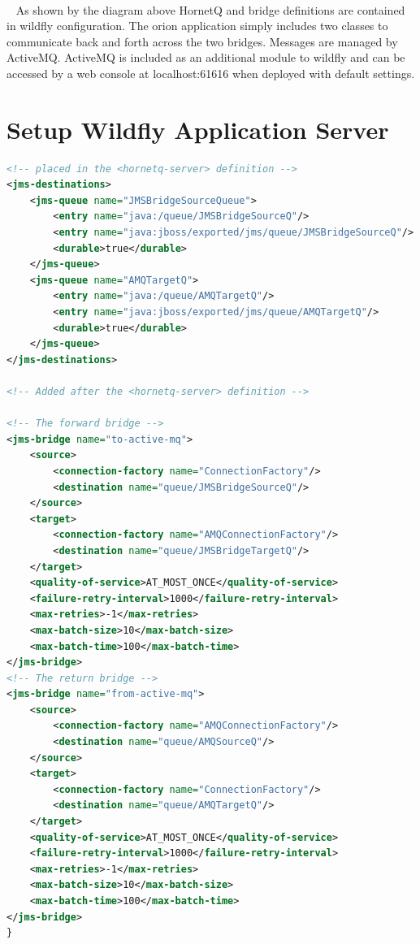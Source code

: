 \documentclass[
10pt, %
letterpaper, %
oneside, %
headinclude,footinclude, %
BCOR5mm, %
]{scrartcl}
\begin{document}
\paragraph{}~\newline
As shown by the diagram above HornetQ and bridge definitions are contained in wildfly configuration. The orion application simply includes two classes to communicate back and forth across the two bridges. Messages are managed by ActiveMQ. ActiveMQ is included as an additional module to wildfly and can be accessed by a web console at localhost:61616 when deployed with default settings.


\section{Setup Wildfly Application Server}


\begin{lstlisting}[language=XML]
<!-- placed in the <hornetq-server> definition -->
<jms-destinations>
	<jms-queue name="JMSBridgeSourceQueue">
		<entry name="java:/queue/JMSBridgeSourceQ"/>
		<entry name="java:jboss/exported/jms/queue/JMSBridgeSourceQ"/>
		<durable>true</durable>
	</jms-queue>
	<jms-queue name="AMQTargetQ">
		<entry name="java:/queue/AMQTargetQ"/>
		<entry name="java:jboss/exported/jms/queue/AMQTargetQ"/>
		<durable>true</durable>
	</jms-queue>
</jms-destinations>

<!-- Added after the <hornetq-server> definition -->

<!-- The forward bridge -->
<jms-bridge name="to-active-mq">
	<source>
		<connection-factory name="ConnectionFactory"/>
		<destination name="queue/JMSBridgeSourceQ"/>
	</source>
	<target>
		<connection-factory name="AMQConnectionFactory"/>
		<destination name="queue/JMSBridgeTargetQ"/>
	</target>
	<quality-of-service>AT_MOST_ONCE</quality-of-service>
	<failure-retry-interval>1000</failure-retry-interval>
	<max-retries>-1</max-retries>
	<max-batch-size>10</max-batch-size>
	<max-batch-time>100</max-batch-time>
</jms-bridge>
<!-- The return bridge -->
<jms-bridge name="from-active-mq">
	<source>
		<connection-factory name="AMQConnectionFactory"/>
		<destination name="queue/AMQSourceQ"/>
	</source>
	<target>
		<connection-factory name="ConnectionFactory"/>
		<destination name="queue/AMQTargetQ"/>
	</target>
	<quality-of-service>AT_MOST_ONCE</quality-of-service>
	<failure-retry-interval>1000</failure-retry-interval>
	<max-retries>-1</max-retries>
	<max-batch-size>10</max-batch-size>
	<max-batch-time>100</max-batch-time>
</jms-bridge>
}
\end{lstlisting}
\end{document}
